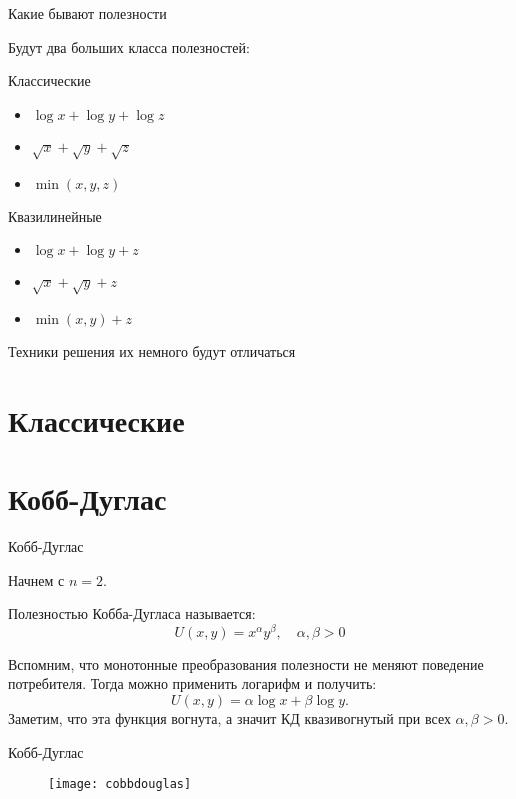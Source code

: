 \documentclass{beamer}
\begin{document}
\begin{frame}{Какие бывают полезности}

Будут два больших класса полезностей:

\alert{Классические}
\begin{itemize}
 \item $\log x + \log y + \log z$
 \item $\sqrt{x} + \sqrt{y} + \sqrt{z}$
 \item $\min(x,y,z)$
\end{itemize}

\alert{Квазилинейные}
\begin{itemize}
  \item $\log x + \log y + z$
  \item $\sqrt{x} + \sqrt{y} + z$
  \item $\min(x,y)+z$
\end{itemize}

Техники решения их немного будут отличаться

\end{frame}

\section{Классические}

\section{Кобб-Дуглас}

\begin{frame}{Кобб-Дуглас}

Начнем с $n = 2$.

\begin{definition}
Полезностью \alert{Кобба-Дугласа} называется:
$$U(x, y) = x^\alpha y^\beta, \quad \alpha, \beta > 0$$  
\end{definition}

Вспомним, что монотонные преобразования полезности не меняют поведение потребителя. Тогда можно применить логарифм и получить:
$$ U(x, y) = \alpha \log x + \beta \log y.$$ 
Заметим, что эта функция вогнута, а значит КД квазивогнутый при всех $\alpha, \beta > 0$.
\end{frame}

\begin{frame}{Кобб-Дуглас}

\begin{figure}[hbt]
\centering
\texttt{[image: cobbdouglas]}
\end{figure}

\end{frame}
\end{document}
